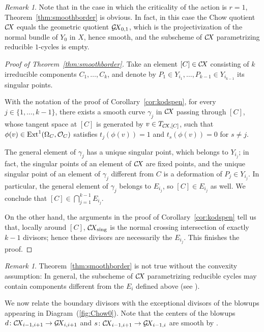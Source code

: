 \documentclass[10pt,a4paper]{article}
\numberwithin{equation}{section}
\theoremstyle{definition}
\theoremstyle{remark}
\newtheorem{remark}[theorem]{Remark}
\def\sing{\operatorname{sing}}
\def\cO{{\mathcal{O}}}
\def\operatorname#1{\mathop{\rm #1}\nolimits}
\def\Ext{\operatorname{Ext}}
\def\prul{s}
\def\prur{d}
\def\GX{\mathcal{G}\!X\hspace{-0.5pt}}
\def\CX{\mathcal{C}\!X\hspace{-0.5pt}}
\begin{document}
\begin{remark}\label{rem:main1}
Note that in the case in which the criticality of the action is $r=1$, Theorem~\ref{thm:smoothborder} is obvious. In fact, in this case the Chow quotient $\CX$ equals the geometric quotient $\GX_{0,1}$, which is the projectivization of the normal bundle of $Y_0$ in $X$, hence smooth, and the subscheme of $\CX$ parametrizing reducible $1$-cycles is empty.
\end{remark}

\begin{proof}[Proof of Theorem~\ref{thm:smoothborder}]
Take an element $[C]\in \CX$ consisting of $k$ irreducible components $C_1,\dots,C_k$, and denote by $P_1\in Y_{i_1},\dots, P_{k-1}\in Y_{i_{k-1}}$ its singular points. 

With the notation of the proof of Corollary~\ref{cor:kodspen}, for every $j\in\{1,\dots,k-1\}$, there exists a smooth  curve $\gamma_j$ in $\CX$ passing through
 $[C]$, whose tangent space at $[C]$ is generated by $v\in T_{\CX,[C]}$, such that $\phi(v)\in \Ext^1(\Omega_C,\cO_C)$ satisfies $t_j(\phi(v))=1$ and $t_s(\phi(v))=0$ for $s\neq j$. 

The general element of $\gamma_j$ has a unique singular point, which belongs to $Y_{i_j}$; in fact, the singular points of an element of $\CX$ are fixed points, and the unique singular point of an element of $\gamma_j$ different from $C$ is a deformation of $P_j\in Y_{i_j}$. In particular, the general element of $\gamma_j$ belongs to  $E_{i_j}$, so $[C]\in E_{i_j}$ as well. We conclude that $[C]\in \bigcap_{j=1}^{k-1}E_{i_j}$.


On the other hand, the arguments in the proof of Corollary~\ref{cor:kodspen} tell us that, locally around $[C]$, $\CX_{\sing}$ is the normal crossing intersection of exactly $k-1$ divisors; hence these divisors are necessarily the $E_{i_j}$.  This finishes the proof.
\end{proof}

\begin{remark}\label{rem:smoothborder}
Theorem~\ref{thm:smoothborder} is not true without the convexity assumption: In general, the subscheme of $\CX$ parametrizing reducible cycles may contain components different from the $E_i$ defined above (see \cite[Example~6.1]{WORS6}). 
\end{remark}

We now relate the boundary divisors with the exceptional divisors of the blowups appearing in Diagram~(\ref{fig:Chow0}). Note that the centers of the blowups $\prur\colon\CX_{i-1,i+1}\to \GX_{i,i+1}$ and $\prul\colon\CX_{i-1,i+1}\to \GX_{i-1,i}$ are smooth by  \cite[Lemma~5.7]{WORS6}. 
\end{document}

